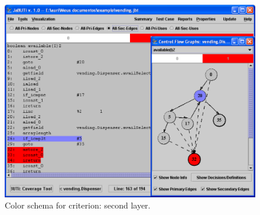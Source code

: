 \begin{figure}[!ht]
\begin{center}
\includegraphics[height=0.40\textheight]{fig/sec-edges-layer2.eps}
\caption{\label{fig:sec-edges-2} Color schema for
 criterion: second layer.}
\end{center}
\end{figure}

